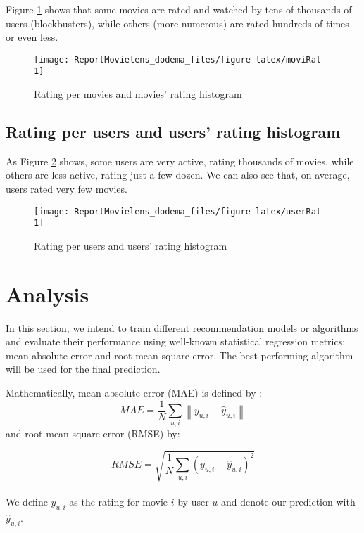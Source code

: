 \documentclass[
]{article}
\begin{document}
Figure \ref{fig:moviRat} shows that some movies are rated and watched by tens of thousands of users (blockbusters), while others (more numerous) are rated hundreds of times or even less.

\begin{figure}[H]

{\centering \texttt{[image: ReportMovielens\_dodema\_files/figure-latex/moviRat-1]} 

}

\caption{Rating per movies and movies' rating histogram}\label{fig:moviRat}
\end{figure}

\subsection{Rating per users and users' rating histogram}\label{rating-per-users-and-users-rating-histogram}

As Figure \ref{fig:userRat} shows, some users are very active, rating thousands of movies, while others are less active, rating just a few dozen. We can also see that, on average, users rated very few movies.

\begin{figure}[H]

{\centering \texttt{[image: ReportMovielens\_dodema\_files/figure-latex/userRat-1]} 

}

\caption{Rating per users and users' rating histogram}\label{fig:userRat}
\end{figure}

\section{Analysis}\label{analysis}

In this section, we intend to train different recommendation models or algorithms and evaluate their performance using well-known statistical regression metrics: mean absolute error and root mean square error. The best performing algorithm will be used for the final prediction.

Mathematically, mean absolute error (MAE) is defined by :
\begin{equation} 
    MAE = \frac{1}{N}\sum_{u,i}\left\| y_{u,i}-\hat{y}_{u,i}\right\|
  \label{eq:metricMAE}
\end{equation}
and root mean square error (RMSE) by:

\begin{equation} 
    RMSE = \sqrt{\frac{1}{N}\sum_{u,i}\left(y_{u,i}-\hat{y}_{u,i}\right)^{2}}
  \label{eq:metricRMSE}
\end{equation}\\
We define \(y_{u,i}\) as the rating for movie \(i\) by user \(u\) and denote our prediction with \(\hat{y}_{u,i}\).
\end{document}
